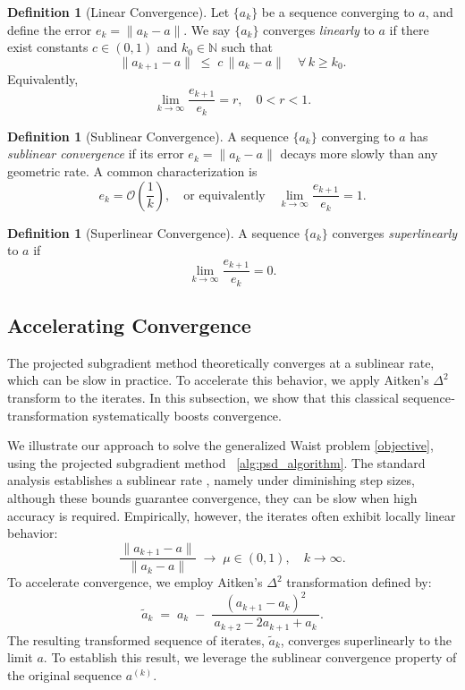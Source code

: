 \documentclass[12pt]{article}
\theoremstyle{plain}
\theoremstyle{definition}
\newtheorem{definition}[theorem]{Definition}
\begin{document}
\begin{definition}[Linear Convergence]
	\label{def:linear_convergence}
	Let $\{a_k\}$ be a sequence converging to $a$, and define the error $e_k = \|a_k - a\|$.  We say $\{a_k\}$ converges \emph{linearly} to $a$ if there exist constants $c\in(0,1)$ and $k_0\in\mathbb{N}$ such that
	\[
	\|a_{k+1}-a\|\;\le\;c\,\|a_k-a\|
	\quad\forall\,k\ge k_0.
	\]
	Equivalently,
	\[
	\lim_{k\to\infty}\frac{e_{k+1}}{e_k} = r,\quad 0<r<1.
	\]
\end{definition}

\begin{definition}[Sublinear Convergence]
	\label{def:sublinear_convergence}
	A sequence $\{a_k\}$ converging to $a$ has \emph{sublinear convergence} if its error $e_k=\|a_k-a\|$ decays more slowly than any geometric rate.  A common characterization is
	\[
	e_k = \mathcal{O}\left(\frac{1}{k}\right),
	\quad\text{or equivalently}\quad
	\lim_{k \to \infty}\frac{e_{k+1}}{e_k}=1.
	\]
\end{definition}

\begin{definition}[Superlinear Convergence]
	\label{def:superlinear_convergence}
	A sequence $\{a_k\}$ converges \emph{superlinearly} to $a$ if
	\[
	\lim_{k\to\infty}\frac{e_{k+1}}{e_k} = 0.
	\]
\end{definition}

\subsection{Accelerating Convergence}
\label{Accelerating_Convergence}

The projected subgradient method theoretically converges at a sublinear rate, which can be slow in practice. To accelerate this behavior, we apply Aitken’s $\Delta^2$ transform to the iterates. In this subsection, we show that this classical sequence‐transformation systematically boosts convergence.

We illustrate our approach to solve the generalized Waist problem  \eqref{objective}, using the projected subgradient method~ \ref{alg:psd_algorithm}. The  standard analysis establishes a sublinear rate \cite[Theorem 9.16]{Be14}, namely under diminishing step sizes, although these bounds guarantee convergence, they can be slow when high accuracy is required.  Empirically, however, the iterates often exhibit locally linear behavior:
\[
\frac{\|a_{k+1}-a\|}{\|a_k-a\|}\;\to\;\mu\in(0,1),
\quad k\to\infty.
\]
To accelerate convergence, we employ Aitken’s $\Delta^2$ transformation defined by:
\[
\tilde{a}_k
\;=\;
a_k
\;-\;
\frac{(a_{k+1}-a_k)^2}
{\,a_{k+2}-2a_{k+1}+a_k\,}.
\]
The resulting transformed sequence of iterates, $\tilde{a}_k$, converges superlinearly to the limit $a$. To establish this result, we leverage the sublinear convergence property of the original sequence $a^{(k)}$.
\end{document}
